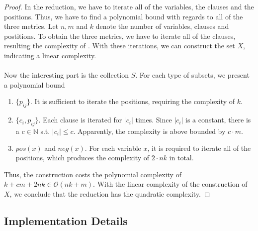 \begin{proof}
    In the reduction, we have to iterate all of the variables, the clauses and the positions. 
    Thus, we have to find a polynomial bound with regards to all of the three metrics. Let $n, m$ and $k$ denote 
    the number of variables, clauses and postitions. To obtain the three metrics, we have to iterate 
    all of the clauses, resulting the complexity of . With these iterations, we can construct the set $X$,
    indicating a linear complexity. \\\\
    Now the interesting part is the collection $S$. For each type of subsets, we present a polynomial bound 
\begin{enumerate}
    \item $\{p_{ij}\}$. It is sufficient to iterate the positions, requiring the complexity of $k$.
    \item $\{c_i, p_{ij}\}$. Each clause is iterated for $|c_i|$ times. Since $|c_i|$ is a constant, there is a $c \in \mathbb{N}$ 
    s.t. $|c_i| \leq c$. Apparently, the complexity is above bounded by $c \cdot m$.
    \item $pos(x)$ and $neg(x)$. For each variable $x$, it is required to iterate all of the positions, which produces the complexity 
    of $2 \cdot nk$ in total.
\end{enumerate}
Thus, the construction costs the polynomial complexity of $k + cm + 2nk \in \mathcal{O}(nk + m)$. 
With the linear complexity of the construction of $X$, we conclude that the reduction has the quadratic complexity.
\end{proof}

\subsection{Implementation Details}
\label{sec:sat-imp}
